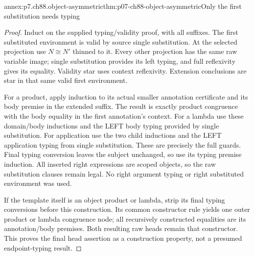 \begin{annexitem}{annex:p7.ch88.object-asymmetric}{thm:p07-ch88-object-asymmetric}{Only the first substitution needs typing}
\begin{proof}
Induct on the supplied typing/validity proof, with all suffixes. The
first substituted environment is valid by source single substitution.
At the selected projection use \(N\cong N'\) thinned to it. Every
other projection has the same raw variable image; single substitution
provides its left typing, and full reflexivity gives its equality.
Validity star uses context reflexivity. Extension conclusions are star
in that same valid first environment.

For a product, apply induction to its actual smaller annotation
certificate and its body premise in the extended suffix. The result
is exactly product congruence with the body equality in the first
annotation's context. For a lambda use these domain/body inductions
and the LEFT body typing provided by single substitution. For
application use the two child inductions and the LEFT application
typing from single substitution. These are precisely the full guards.
Final typing conversion leaves the subject unchanged, so use its
typing premise induction. All inserted right expressions are scoped
objects, so the raw substitution clauses remain legal. No right
argument typing or right substituted environment was used.

If the template itself is an object product or lambda, strip its
final typing conversions before this construction. Its common
constructor rule yields one outer product or lambda congruence node;
all recursively constructed equalities are its annotation/body
premises. Both resulting raw heads remain that constructor. This
proves the final head assertion as a construction property, not a
presumed endpoint-typing result.
\end{proof}
\end{annexitem}

